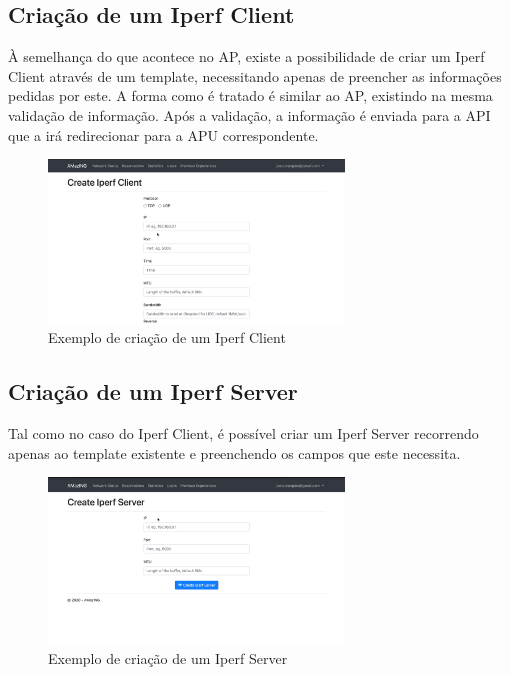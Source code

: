 \subsection{Criação de um Iperf Client}
À semelhança do que acontece no AP, existe a possibilidade de criar um Iperf Client através de um template, necessitando apenas de preencher as informações pedidas por este. A forma como é tratado é similar ao AP, existindo na mesma validação de informação. Após a validação, a informação é enviada para a API que a irá redirecionar para a APU correspondente.
\begin{figure}[!ht]
    \centering
    \includegraphics[width=0.7\textwidth]{images/create_iperfcli.png}
    \caption{Exemplo de criação de um Iperf Client}
    \label{fig:iperfcli}
\end{figure}

\subsection{Criação de um Iperf Server}
Tal como no caso do Iperf Client, é possível criar um Iperf Server recorrendo apenas ao template existente e preenchendo os campos que este necessita.
\begin{figure}[!ht]
    \centering
    \includegraphics[width=0.7\textwidth]{images/create_iperfsv.png}
    \caption{Exemplo de criação de um Iperf Server}
    \label{fig:iperfserv}
\end{figure}

